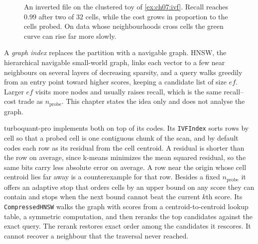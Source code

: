 \begin{figure}[tbp]\centering
{}
\caption{An inverted file on the clustered toy of \cref{ex:ch07:ivf}. Recall reaches $0.99$ after two of $32$ cells, while the cost grows in proportion to the cells probed. On data whose neighbourhoods cross cells the green curve can rise far more slowly.}
\label{fig:ch07:ivf}
\end{figure}

A \emph{graph index} replaces the partition with a navigable graph. HNSW, the hierarchical navigable small-world graph, links each vector to a few near neighbours on several layers of decreasing sparsity, and a query walks greedily from an entry point toward higher scores, keeping a candidate list of size $\mathit{ef}$. Larger $\mathit{ef}$ visits more nodes and usually raises recall, which is the same recall--cost trade as $n_{\mathrm{probe}}$. This chapter states the idea only and does not analyse the graph.

turboquant-pro implements both on top of its codes. Its \texttt{IVFIndex} sorts rows by cell so that a probed cell is one contiguous chunk of the scan, and by default codes each row as its residual from the cell centroid. A residual is shorter than the row on average, since k-means minimizes the mean squared residual, so the same bits carry less absolute error on average. A row near the origin whose cell centroid lies far away is a counterexample for that row. Besides a fixed $n_{\mathrm{probe}}$ it offers an adaptive stop that orders cells by an upper bound on any score they can contain and stops when the next bound cannot beat the current $k$th score. Its \texttt{CompressedHNSW} walks the graph with scores from a centroid-to-centroid lookup table, a symmetric computation, and then reranks the top candidates against the exact query. The rerank restores exact order among the candidates it rescores. It cannot recover a neighbour that the traversal never reached.

